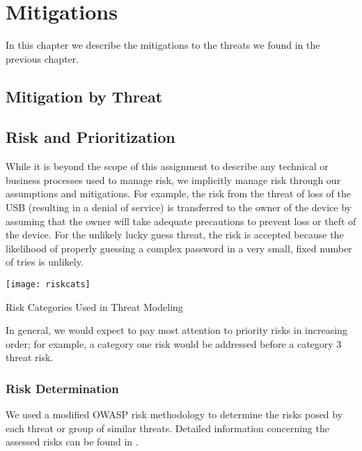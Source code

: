 \chapter{Mitigations}
\label{ch:mitigations}
In this chapter we describe the mitigations to the threats we found in
the previous chapter.

\section{Mitigation by Threat}

\section{Risk and Prioritization}
\label{sec:risk}
While it is beyond the scope of this assignment to describe any technical or
business processes used to manage risk, we implicitly manage risk through our
assumptions and mitigations.  For example, the risk from the threat of loss of
the USB (resulting in a denial of service) is transferred to the owner of the
device by assuming that the owner will take adequate precautions to prevent loss
or theft of the device.  For the unlikely lucky guess threat, the risk is
accepted because the likelihood of properly guessing a complex password in a
very small, fixed number of tries is unlikely.

\begin{marginfigure}
    \centering
    \texttt{[image: riskcats]}
    \caption{Risk Categories Used in Threat Modeling}
    \label{fig:riskcats}
\end{marginfigure}

In general, we would expect to pay most attention to priority risks in
increasing order; for example, a category one risk would be addressed before a
category 3 threat risk.

\subsection{Risk Determination}
We used a modified OWASP risk methodology to determine the risks posed by each
threat or group of similar threats. Detailed information concerning the assessed
risks can be found in .
